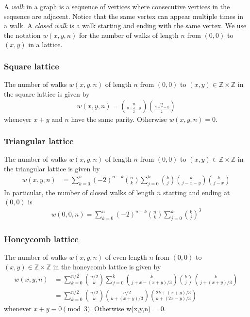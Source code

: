 \documentclass[12pt]{article}
\begin{document}
\begin{defs}
A {\em walk} in a graph is a sequence of vertices where consecutive vertices in the sequence are adjacent. Notice that the same vertex can appear multiple times in a walk.  A {\em closed walk} is a walk starting and ending with the same vertex. We use the notation $w(x,y,n)$ for the number of walks of length $n$ from $(0,0)$ to $(x,y)$ in a lattice.
\end{defs}

\subsubsection*{Square lattice}
The number of walks $w(x,y,n)$ of length $n$ from $(0,0)$ to $(x,y) \in \mathbb{Z} \times \mathbb{Z}$ in the square lattice is given by
\begin{align*}
  w(x,y,n) = \binom{n}{\frac{n+x-y}{2}} \binom{n}{\frac{n-x-y}{2}}
\end{align*}
whenever $x+y$ and $n$ have the same parity. Otherwise $w(x,y,n) = 0$.

\subsubsection*{Triangular lattice}
The number of walks $w(x,y,n)$ of length $n$ from $(0,0)$ to $(x,y) \in \mathbb{Z} \times \mathbb{Z}$ in the triangular lattice is given by
\begin{align*}
 w(x,y,n) &= \sum_{k=0}^n(-2)^{n-k}\binom{n}{k} \sum_{j=0}^k \binom{k}{j} \binom{k}{j-x-y}\binom{k}{j-x}
\end{align*}
In particular, the number of closed walks of length $n$ starting and ending at $(0,0)$ is
\begin{align*}
   w(0,0,n) = \sum_{k=0}^n(-2)^{n-k}\binom{n}{k} \sum_{j=0}^k \binom{k}{j}^3
\end{align*}

\subsubsection*{Honeycomb lattice}
The number of walks $w(x,y,n)$ of even length $n$ from $(0,0)$ to $(x,y) \in \mathbb{Z} \times \mathbb{Z}$ in the honeycomb lattice is given by
\begin{align*}
  w(x,y,n) &= \sum_{k=0}^{n/2} \binom{n/2}{k} \sum_{j=0}^k \binom{k}{j + x-(x+y)/3} \binom{k}{j} \binom{k}{j + (x+y)/3}\\
  &= \sum_{k=0}^{n/2}\binom{n/2}{k}\binom{n/2}{k+(x+y)/3}\binom{2k+(x+y)/3}{k+(2x-y)/3}
\end{align*}
whenever $x+y \equiv 0 \pmod{3}$. Otherwise w(x,y,n) = 0.
\end{document}
